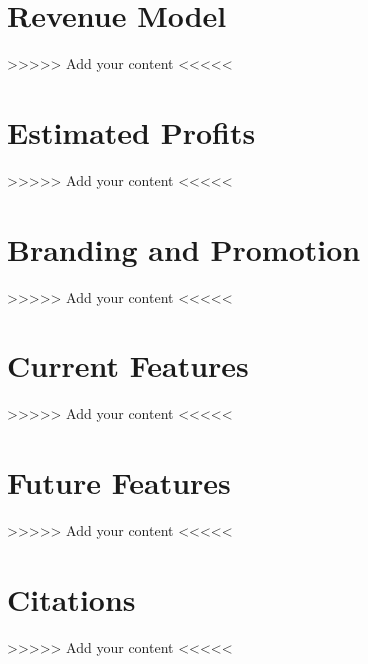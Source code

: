 \documentclass[11pt,fleqn]{book} %
\begin{document}
\chapter{Revenue Model}

>>>>> Add your content <<<<<



\chapter{Estimated Profits}

>>>>> Add your content <<<<<



\chapter{Branding and Promotion}

>>>>> Add your content <<<<<



\chapter{Current Features}

>>>>> Add your content <<<<<



\chapter{Future Features}

>>>>> Add your content <<<<<



\chapter{Citations}

>>>>> Add your content <<<<<
\end{document}
